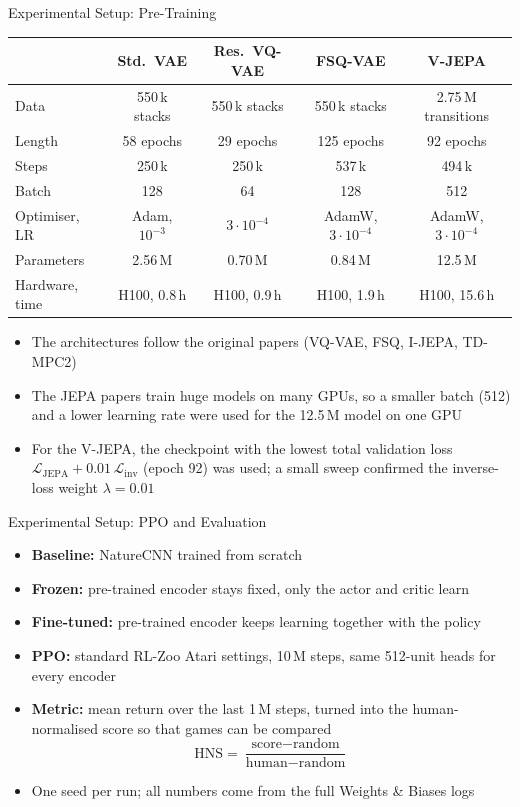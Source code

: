 \documentclass[aspectratio=43,10pt]{beamer}
\begin{document}
\begin{frame}{Experimental Setup: Pre-Training}
  \centering
  {\scriptsize\setlength{\tabcolsep}{3pt}
  \begin{tabular}{@{}lcccc@{}}
    \toprule
    & Std.\ VAE & Res.\ VQ-VAE & FSQ-VAE & V-JEPA \\
    \midrule
    Data & 550\,k stacks & 550\,k stacks & 550\,k stacks & 2.75\,M transitions \\
    Length & 58 epochs & 29 epochs & 125 epochs & 92 epochs \\
    Steps & 250\,k & 250\,k & 537\,k & 494\,k \\
    Batch & 128 & 64 & 128 & 512 \\
    Optimiser, LR & Adam, $10^{-3}$ & $3{\cdot}10^{-4}$ & AdamW, $3{\cdot}10^{-4}$ & AdamW, $3{\cdot}10^{-4}$ \\
    Parameters & 2.56\,M & 0.70\,M & 0.84\,M & 12.5\,M \\
    Hardware, time & H100, 0.8\,h & H100, 0.9\,h & H100, 1.9\,h & H100, 15.6\,h \\
    \bottomrule
  \end{tabular}}
  \vspace{0.8em}
  \begin{itemize}\small\setlength\itemsep{0.4em}
    \item The architectures follow the original papers (VQ-VAE, FSQ, I-JEPA, TD-MPC2)
    \item The JEPA papers train huge models on many GPUs, so a smaller batch (512) and a lower
          learning rate were used for the 12.5\,M model on one GPU
    \item For the V-JEPA, the checkpoint with the lowest total validation loss
          $\mathcal{L}_{\text{JEPA}}+0.01\,\mathcal{L}_{\text{inv}}$ (epoch 92) was used; a small
          sweep confirmed the inverse-loss weight $\lambda=0.01$
  \end{itemize}
\end{frame}

\begin{frame}{Experimental Setup: PPO and Evaluation}
  \begin{itemize}\setlength\itemsep{0.55em}
    \item \textbf{Baseline:} NatureCNN trained from scratch
    \item \textbf{Frozen:} pre-trained encoder stays fixed, only the actor and critic learn
    \item \textbf{Fine-tuned:} pre-trained encoder keeps learning together with the policy
    \item \textbf{PPO:} standard RL-Zoo Atari settings, 10\,M steps, same 512-unit heads for
          every encoder
    \item \textbf{Metric:} mean return over the last 1\,M steps, turned into the
          human-normalised score so that games can be compared
      \[\text{HNS}=\frac{\text{score}-\text{random}}{\text{human}-\text{random}}\]
    \item One seed per run; all numbers come from the full Weights \& Biases logs
  \end{itemize}
\end{frame}
\end{document}
